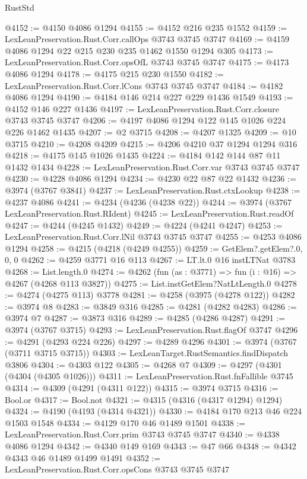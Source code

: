 \begin{lexlean}{RustStd}
\begin{coremodule}
@4152 := @4150 @4086 @1294
@4155 := @4152 @216 @235 @1552
@4159 := LexLeanPreservation.Rust.Corr.callOps @3743 @3745 @3747
@4169 := @4159 @4086 @1294 @22 @215 @230 @235 @1462 @1550 @1294 @305
@4173 := LexLeanPreservation.Rust.Corr.opsOfL @3743 @3745 @3747
@4175 := @4173 @4086 @1294
@4178 := @4175 @215 @230 @1550
@4182 := LexLeanPreservation.Rust.Corr.lCons @3743 @3745 @3747
@4184 := @4182 @4086 @1294
@4190 := @4184 @146 @214 @227 @229 @1436 @1549
@4193 := @4152 @146 @227 @1436
@4197 := LexLeanPreservation.Rust.Corr.closure @3743 @3745 @3747
@4206 := @4197 @4086 @1294 @122 @145 @1026 @224 @226 @1462 @1435
@4207 := @2 @3715
@4208 := @4207 @1325
@4209 := @10 @3715
@4210 := @4208 @4209
@4215 := @4206 @4210 @37 @1294 @1294 @316
@4218 := @4175 @145 @1026 @1435
@4224 := @4184 @142 @144 @87 @11 @1432 @1434
@4228 := LexLeanPreservation.Rust.Corr.var @3743 @3745 @3747
@4230 := @4228 @4086 @1294
@4234 := @4230 @22 @87 @22 @1432
@4236 := @3974 (@3767 @3841)
@4237 := LexLeanPreservation.Rust.ctxLookup
@4238 := @4237 @4086
@4241 := @4234 (@4236 (@4238 @22))
@4244 := @3974 (@3767 LexLeanPreservation.Rust.RIdent)
@4245 := LexLeanPreservation.Rust.readOf
@4247 := @4244 (@4245 @1432)
@4249 := @4224 (@4241 @4247)
@4253 := LexLeanPreservation.Rust.Corr.lNil @3743 @3745 @3747
@4255 := @4253 @4086 @1294
@4258 := @4215 (@4218 (@4249 @4255))
@4259 := GetElem?.getElem?.{0, 0, 0}
@4262 := @4259 @3771 @16 @113
@4267 := LT.lt.{0} @16 instLTNat @3783
@4268 := List.length.{0}
@4274 := @4262 (fun (as : @3771) => fun (i : @16) => @4267 (@4268 @113 @3827))
@4275 := List.instGetElem?NatLtLength.{0}
@4278 := @4274 (@4275 @113) @3778
@4281 := @4258 (@3975 (@4278 @122))
@4282 := @3974 @8
@4283 := @3849 @316
@4285 := @4281 (@4282 @4283)
@4286 := @3974 @7
@4287 := @3873 @316
@4289 := @4285 (@4286 @4287)
@4291 := @3974 (@3767 @3715)
@4293 := LexLeanPreservation.Rust.flagOf @3747
@4296 := @4291 (@4293 @224 @226)
@4297 := @4289 @4296
@4301 := @3974 (@3767 (@3711 @3715 @3715))
@4303 := LexLeanTarget.RustSemantics.findDispatch @3806
@4304 := @4303 @122
@4305 := @4268 @7
@4309 := @4297 (@4301 (@4304 (@4305 @1026)))
@4311 := LexLeanPreservation.Rust.fnFallible @3745
@4314 := @4309 (@4291 (@4311 @122))
@4315 := @3974 @3715
@4316 := Bool.or
@4317 := Bool.not
@4321 := @4315 (@4316 (@4317 @1294) @1294)
@4324 := @4190 (@4193 (@4314 @4321))
@4330 := @4184 @170 @213 @46 @224 @1503 @1548
@4334 := @4129 @170 @46 @1489 @1501
@4338 := LexLeanPreservation.Rust.Corr.prim @3743 @3745 @3747
@4340 := @4338 @4086 @1294
@4342 := @4340 @149 @169
@4343 := @47 @66
@4348 := @4342 @4343 @46 @1489 @1499 @1491
@4352 := LexLeanPreservation.Rust.Corr.opsCons @3743 @3745 @3747

\end{coremodule}
\end{lexlean}
